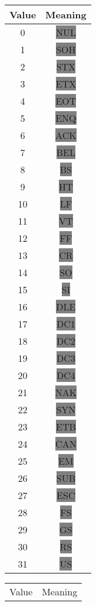 {\scriptsize\ttfamily\begin{tabular}{c c}
  \hline
  Value & Meaning \\
  \hline
    0 & \colorbox{gray}{NUL} \\
    1 & \colorbox{gray}{SOH} \\
    2 & \colorbox{gray}{STX} \\
    3 & \colorbox{gray}{ETX} \\
    4 & \colorbox{gray}{EOT} \\
    5 & \colorbox{gray}{ENQ} \\
    6 & \colorbox{gray}{ACK} \\
    7 & \colorbox{gray}{BEL} \\
    8 & \colorbox{gray}{BS} \\
    9 & \colorbox{gray}{HT} \\
   10 & \colorbox{gray}{LF} \\
   11 & \colorbox{gray}{VT} \\
   12 & \colorbox{gray}{FF} \\
   13 & \colorbox{gray}{CR} \\
   14 & \colorbox{gray}{SO} \\
   15 & \colorbox{gray}{SI} \\
   16 & \colorbox{gray}{DLE} \\
   17 & \colorbox{gray}{DC1} \\
   18 & \colorbox{gray}{DC2} \\
   19 & \colorbox{gray}{DC3} \\
   20 & \colorbox{gray}{DC4} \\
   21 & \colorbox{gray}{NAK} \\
   22 & \colorbox{gray}{SYN} \\
   23 & \colorbox{gray}{ETB} \\
   24 & \colorbox{gray}{CAN} \\
   25 & \colorbox{gray}{EM} \\
   26 & \colorbox{gray}{SUB} \\
   27 & \colorbox{gray}{ESC} \\
   28 & \colorbox{gray}{FS} \\
   29 & \colorbox{gray}{GS} \\
   30 & \colorbox{gray}{RS} \\
   31 & \colorbox{gray}{US} \\
\end{tabular}
\begin{tabular}{c c}
  \hline
  Value & Meaning \\

\end{tabular}}
